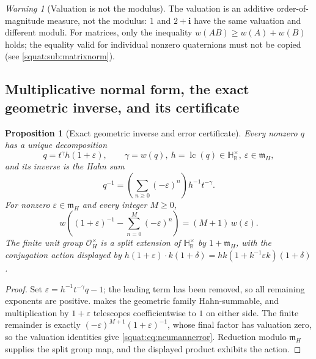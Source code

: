 \documentclass[11pt,letterpaper]{article}
\numberwithin{equation}{section}
\newtheorem{proposition}[proposition]{Proposition}
\theoremstyle{definition}
\theoremstyle{remark}
\newtheorem{warning}[warning]{Warning}
\newcommand{\HR}{\mathbb H_{\mathbb R}}
\newcommand{\OO}{\mathcal O}
\newcommand{\mm}{\mathfrak m}
\newcommand{\eps}{\varepsilon}
\newcommand{\ii}{\mathbf i}
\newcommand{\lc}{\operatorname{lc}}
\begin{document}
\begin{warning}[Valuation is not the modulus]\label{squat:warn:valnotnorm}
The valuation is an additive order-of-magnitude measure, not the modulus: $1$ and
$2+\ii$ have the same valuation and different moduli. For matrices, only the inequality
$w(AB)\ge w(A)+w(B)$ holds; the equality valid for individual nonzero quaternions must
not be copied (see \cref{squat:sub:matrixnorm}).
\end{warning}

\subsection{Multiplicative normal form, the exact geometric inverse, and its certificate}
\label{squat:sub:geominverse}

\begin{proposition}[Exact geometric inverse and error certificate]\label{squat:prop:neumann}
Every nonzero $q$ has a unique decomposition
\begin{equation}\label{squat:eq:leadingdecomp}
 q=t^\gamma h(1+\eps),\qquad
 \gamma=w(q),\ h=\lc(q)\in\HR^\times,\ \eps\in\mm_H,
\end{equation}
and its inverse is the Hahn sum
\begin{equation}\label{squat:eq:neumann}
 q^{-1}=\left(\sum_{n\ge0}(-\eps)^n\right)h^{-1}t^{-\gamma}.
\end{equation}
For nonzero $\eps\in\mm_H$ and every integer $M\ge0$,
\begin{equation}\label{squat:eq:neumannerror}
 w\left((1+\eps)^{-1}-\sum_{n=0}^M(-\eps)^n\right)=(M+1)\,w(\eps).
\end{equation}
The finite unit group $\OO_H^\times$ is a split extension of $\HR^\times$ by $1+\mm_H$,
with the conjugation action displayed by
$h(1+\eps)\cdot k(1+\delta)=hk(1+k^{-1}\eps k)(1+\delta)$.
\end{proposition}
\begin{proof}
Set $\eps=h^{-1}t^{-\gamma}q-1$; the leading term has been removed, so all remaining
exponents are positive.  makes the geometric family
Hahn-summable, and multiplication by $1+\eps$ telescopes coefficientwise to $1$ on either
side. The finite remainder is exactly $(-\eps)^{M+1}(1+\eps)^{-1}$, whose final factor has
valuation zero, so the valuation identities give \cref{squat:eq:neumannerror}. Reduction
modulo $\mm_H$ supplies the split group map, and the displayed product exhibits the
action.
\end{proof}
\end{document}
